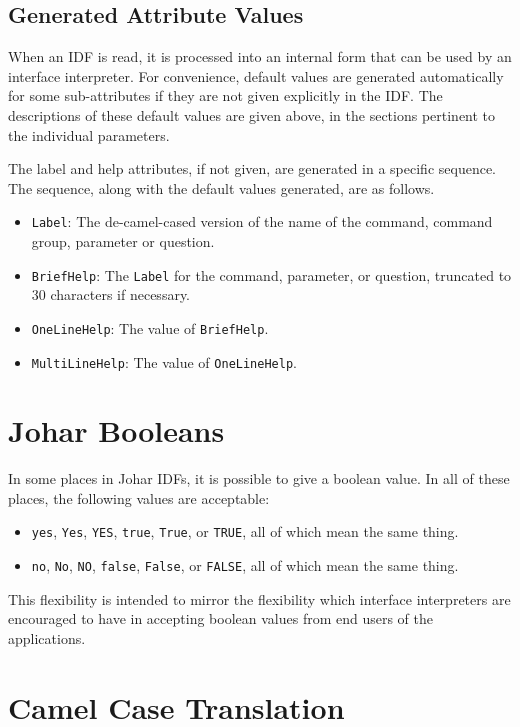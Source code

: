 \documentclass[11pt]{article}
\begin{document}
\subsection{Generated Attribute Values}

When an IDF is read, it is processed into an internal form
that can be used by an interface interpreter.  For convenience,
default values are generated automatically for some sub-attributes if
they are not given explicitly in the IDF.  The descriptions of
these default values are given above, in the sections pertinent
to the individual parameters.

The label and help attributes, if not given, are generated in a specific
sequence.  The sequence, along with the default values generated, are as
follows.
\begin{itemize}
\item {\tt Label}:  The de-camel-cased version of the name of
  the command, command group, parameter or question.
\item {\tt BriefHelp}:  The {\tt Label} for the command, parameter, or
  question, truncated to 30 characters if necessary.
\item {\tt OneLineHelp}:  The value of {\tt BriefHelp}.
\item {\tt MultiLineHelp}:  The value of {\tt OneLineHelp}.
\end{itemize}

\section{Johar Booleans}
\label{johar-booleans-sec}

In some places in Johar IDFs, it is possible to give a boolean value.
In all of these places, the following values are acceptable:
\begin{itemize}
\item \verb/yes/, \verb/Yes/, \verb/YES/, \verb/true/, \verb/True/, or
  \verb/TRUE/, all of which mean the same thing.
\item \verb/no/, \verb/No/, \verb/NO/, \verb/false/, \verb/False/, or
  \verb/FALSE/, all of which mean the same thing.
\end{itemize}
This flexibility is intended to mirror the flexibility which interface
interpreters are encouraged to have in accepting boolean values from end
users of the applications.

\section{Camel Case Translation}
\label{camel-case-sec}
\end{document}
